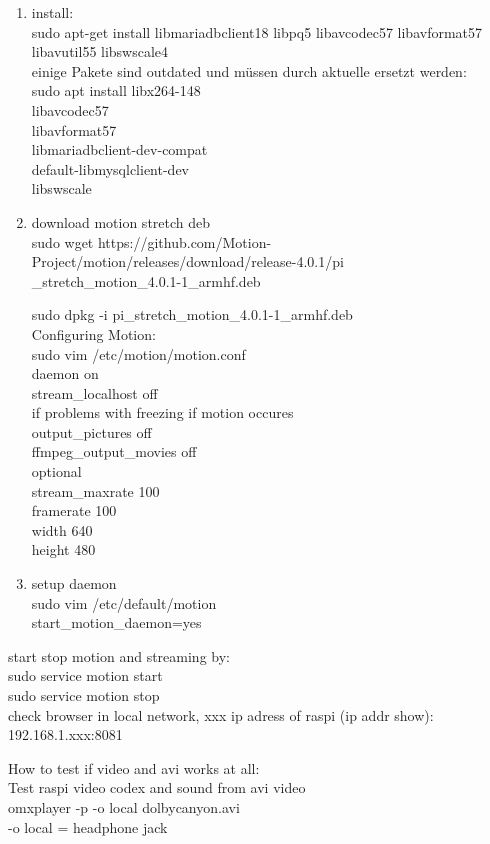 \begin{enumerate}
	\item install:\\
	sudo apt-get install libmariadbclient18 libpq5 libavcodec57  libavformat57 libavutil55 libswscale4\\
	einige Pakete sind outdated und müssen durch aktuelle ersetzt werden:\\
	sudo apt install libx264-148\\
	libavcodec57\\
	libavformat57\\
	libmariadbclient-dev-compat\\
	default-libmysqlclient-dev\\
	libswscale

	\item download motion stretch deb\\
	sudo wget https://github.com/Motion-Project/motion/releases/download/release-4.0.1/pi\\
	\_stretch\_motion\_4.0.1-1\_armhf.deb
	
	sudo dpkg -i pi\_stretch\_motion\_4.0.1-1\_armhf.deb\\

	Configuring Motion:\\
	sudo vim /etc/motion/motion.conf\\
	daemon on\\
	stream\_localhost off\\
	if problems with freezing if motion occures\\
	output\_pictures off\\
	ffmpeg\_output\_movies off\\
	optional\\
	stream\_maxrate 100\\
	framerate 100\\
	width 640\\
	height 480

	\item setup daemon\\
	sudo vim /etc/default/motion\\
	start\_motion\_daemon=yes
\end{enumerate}

start stop motion and streaming by:\\
sudo service motion start\\
sudo service motion stop\\

check browser in local network, xxx ip adress of raspi (ip addr show):\\
192.168.1.xxx:8081

How to test if video and avi works at all:\\
Test raspi video codex and sound from avi video\\
omxplayer -p -o local dolbycanyon.avi\\
-o local = headphone jack



